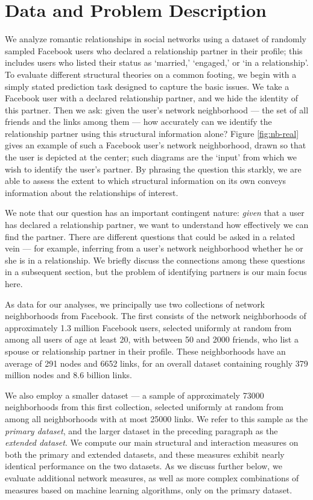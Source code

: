 \documentclass{sigchi}
\begin{document}
\section{Data and Problem Description}

We analyze romantic relationships in social networks
using a dataset of randomly sampled Facebook users
who declared a relationship partner in their profile;
this includes users who listed their status as 
`married,' `engaged,' or `in a relationship'.
To evaluate different structural theories on a common footing, we begin with
a simply stated prediction task designed to capture the basic issues.
We take a Facebook user with a declared relationship partner,
and we hide the identity of this partner.
Then we ask: given the user's network
neighborhood --- the set of all friends and the links among them ---
how accurately can we identify the relationship partner
using this structural information alone?
Figure \ref{fig:nb-real} gives an example of such a Facebook user's
network neighborhood\cite{marlow-facebook-tie-strength-ext},
drawn so that the user is depicted at the center;
such diagrams are the `input' from which we wish to identify the
user's partner.
By phrasing the question this starkly, we are able to assess
the extent to which structural information on its own conveys
information about the relationships of interest.

We note that our question has an important contingent nature:
{\em given} that a user has declared a relationship partner, we want
to understand how effectively we can find the partner.
There are different questions that could be asked in a
related vein --- for example, inferring from a user's
network neighborhood whether he or she is in a relationship.
We briefly discuss the connections among these questions 
in a subsequent section, but the problem of identifying 
partners is our main focus here.

As data for our analyses, we principally use
two collections of network neighborhoods from Facebook.
The first consists of the network neighborhoods of approximately 1.3 million
Facebook users, selected uniformly
at random from among all users of age at least 20, with between
50 and 2000 friends, who list a spouse or relationship partner
in their profile.
These neighborhoods have an average of 291 nodes and 6652 links,
for an overall dataset containing
roughly 379 million nodes and 8.6 billion links.

We also employ a smaller dataset --- a sample of approximately 73000
neighborhoods from this first collection, selected uniformly at
random from among all neighborhoods with at most 25000 links.
We refer to this sample as the {\em primary dataset}, and the
larger dataset in the preceding paragraph as the {\em extended dataset}.
We compute our main structural and interaction measures
on both the primary and extended datasets, and these
measures exhibit nearly identical performance on the two datasets.
As we discuss further below, 
we evaluate additional network measures,
as well as more complex combinations of 
measures based on machine learning algorithms, only on the primary dataset.
\end{document}
